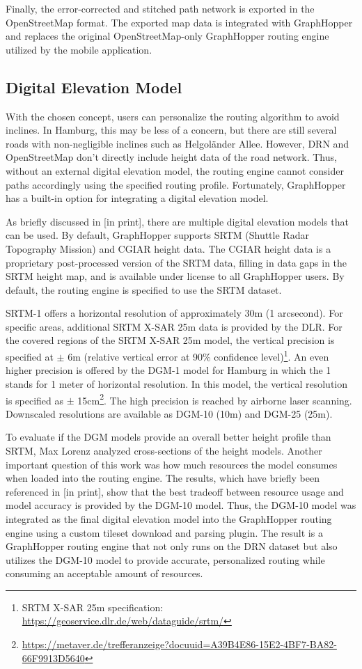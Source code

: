 Finally, the error-corrected and stitched path network is exported in the OpenStreetMap format. The exported map data is integrated with GraphHopper and replaces the original OpenStreetMap-only GraphHopper routing engine utilized by the mobile application.

\subsection{Digital Elevation Model}

With the chosen concept, users can personalize the routing algorithm to avoid inclines. In Hamburg, this may be less of a concern, but there are still several roads with non-negligible inclines such as Helgoländer Allee. However, DRN and OpenStreetMap don't directly include height data of the road network. Thus, without an external digital elevation model, the routing engine cannot consider paths accordingly using the specified routing profile. Fortunately, GraphHopper has a built-in option for integrating a digital elevation model.

As briefly discussed in [in print], there are multiple digital elevation models that can be used. By default, GraphHopper supports SRTM (Shuttle Radar Topography Mission) \cite{farr_shuttle_2000, farr_shuttle_2007} and CGIAR \cite{jarvis_hole_2008} height data. The CGIAR height data is a proprietary post-processed version of the SRTM data, filling in data gaps in the SRTM height map, and is available under license to all GraphHopper users. By default, the routing engine is specified to use the SRTM dataset.

SRTM-1 offers a horizontal resolution of approximately 30m (1 arcsecond). For specific areas, additional SRTM X-SAR 25m data is provided by the DLR. For the covered regions of the SRTM X-SAR 25m model, the vertical precision is specified at $\pm$ 6m (relative vertical error at 90\% confidence level)\footnote{SRTM X-SAR 25m specification: \url{https://geoservice.dlr.de/web/dataguide/srtm/}}. An even higher precision is offered by the DGM-1 model for Hamburg in which the 1 stands for 1 meter of horizontal resolution. In this model, the vertical resolution is specified as $\pm$ 15cm\footnote{\url{https://metaver.de/trefferanzeige?docuuid=A39B4E86-15E2-4BF7-BA82-66F9913D5640}}. The high precision is reached by airborne laser scanning. Downscaled resolutions are available as DGM-10 (10m) and DGM-25 (25m).

To evaluate if the DGM models provide an overall better height profile than SRTM, Max Lorenz analyzed cross-sections of the height models. Another important question of this work was how much resources the model consumes when loaded into the routing engine. The results, which have briefly been referenced in [in print], show that the best tradeoff between resource usage and model accuracy is provided by the DGM-10 model. Thus, the DGM-10 model was integrated as the final digital elevation model into the GraphHopper routing engine using a custom tileset download and parsing plugin. The result is a GraphHopper routing engine that not only runs on the DRN dataset but also utilizes the DGM-10 model to provide accurate, personalized routing while consuming an acceptable amount of resources. 

